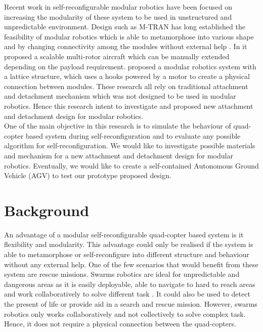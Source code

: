 \documentclass[12pt,A4]{article}
\begin{document}
	
	Recent work in self-reconfigurable modular robotics have been focused on increasing the modularity of these system to be used in unstructured and unpredictable environment. Design such as M-TRAN has long established the feasibility of modular robotics which is able to metamorphose into various shape and by changing connectivity among the modules without external help \citep{murata2002m-tran}. In \citep{duffy2015lift} it proposed a scalable multi-rotor aircraft which can be manually extended depending on the payload requirement. \citep{jorgensen2004modular} proposed a  modular robotics system with a lattice structure, which uses a hooks powered by a motor to create a physical connection between modules. These research all rely on traditional attachment and detachment mechanism which was not designed to be used in modular robotics. Hence this research intent to investigate and proposed new attachment and detachment design for modular robotics.\\
	
	One of the main objective in this research is to simulate the behaviour of quad-copter based system during self-reconfiguration and to evaluate any possible algorithm for self-reconfiguration. We would like to investigate possible materials and mechanism for a new attachment and detachment design for modular robotics. Eventually, we would like to create a self-contained Autonomous Ground Vehicle (AGV) to test our prototype proposed design.\\

	\section{Background}
	
	An advantage of a modular self-reconfigurable quad-copter based system is it flexibility and modularity. This advantage could only be realised if the system is able to metamorphose or self-reconfigure into different structure and behaviour without any external help. One of the few scenarios that would benefit from these system are rescue missions. Swarms robotics are ideal for unpredictable and dangerous areas as it is easily deployable, able to navigate to hard to reach areas and work collaboratively to solve different task \citep{stormont2005autonomous}. It could also be used to detect the present of life or provide aid in a search and rescue mission. However, swarms robotics only works collaboratively and not collectively to solve complex task. Hence, it does not require a physical connection between the quad-copters.\\
	
\end{document}
